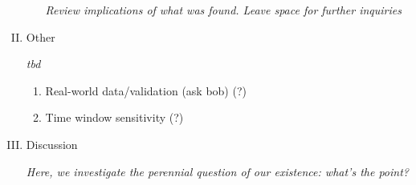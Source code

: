 \documentclass[12pt, letterpaper, twoside]{article}
\begin{document}
\begin{enumerate}[I.]
\begin{enumerate}[1.]
  \textit{Review implications of what was found. Leave space for further inquiries}  
  
  \end{enumerate}
\item Other

\textit{tbd}
  \begin{enumerate}[1.]
  \item Real-world data/validation (ask bob) (?)
  \item Time window sensitivity (?)
  \end{enumerate}
\item Discussion

\textit{Here, we investigate the perennial question of our existence: what's the point?}

\end{enumerate}
\end{document}

